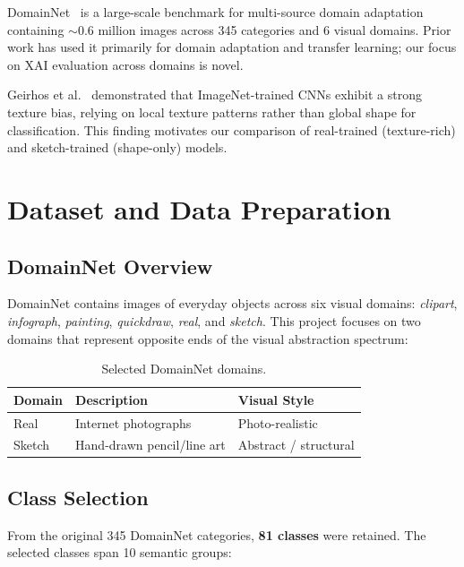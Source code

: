 \documentclass[12pt, a4paper]{article}
\begin{document}
DomainNet~\cite{domainnet} is a large-scale benchmark for multi-source domain
adaptation containing $\sim$0.6 million images across 345 categories and 6
visual domains.  Prior work has used it primarily for domain adaptation and
transfer learning; our focus on XAI evaluation across domains is novel.

Geirhos et al.~\cite{geirhos2019texture} demonstrated that ImageNet-trained
CNNs exhibit a strong texture bias, relying on local texture patterns rather
than global shape for classification.  This finding motivates our comparison
of real-trained (texture-rich) and sketch-trained (shape-only) models.


\section{Dataset and Data Preparation}
\label{sec:dataset}

\subsection{DomainNet Overview}

DomainNet contains images of everyday objects across six visual domains:
\textit{clipart}, \textit{infograph}, \textit{painting}, \textit{quickdraw},
\textit{real}, and \textit{sketch}.  This project focuses on two domains that
represent opposite ends of the visual abstraction spectrum:

\begin{table}[H]
\centering
\caption{Selected DomainNet domains.}
\label{tab:domains}
\begin{tabular}{lll}
\toprule
\textbf{Domain} & \textbf{Description} & \textbf{Visual Style} \\
\midrule
Real   & Internet photographs        & Photo-realistic \\
Sketch & Hand-drawn pencil/line art  & Abstract / structural \\
\bottomrule
\end{tabular}
\end{table}

\subsection{Class Selection}

From the original 345 DomainNet categories, \textbf{81 classes} were retained.
The selected classes span 10 semantic groups:
\end{document}
